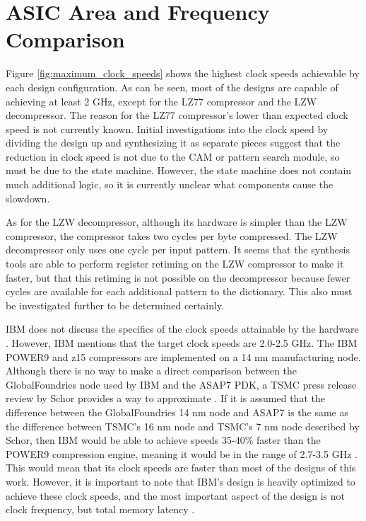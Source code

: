 \documentclass[doublespace,nopageskip]{VTthesis}
\begin{document}
\section{ASIC Area and Frequency Comparison}\label{se:asic_area_and_frequency_comparison}
Figure \ref{fig:maximum_clock_speeds} shows the highest clock speeds achievable by each design configuration. As can be seen, most of the designs are capable of achieving at least 2 GHz, except for the LZ77 compressor and the LZW decompressor. The reason for the LZ77 compressor's lower than expected clock speed is not currently known. Initial investigations into the clock speed by dividing the design up and synthesizing it as separate pieces suggest that the reduction in clock speed is not due to the CAM or pattern search module, so must be due to the state machine. However, the state machine does not contain much additional logic, so it is currently unclear what components cause the slowdown.

As for the LZW decompressor, although its hardware is simpler than the LZW compressor, the compressor takes two cycles per byte compressed. The LZW decompressor only uses one cycle per input pattern. It seems that the synthesis tools are able to perform register retiming on the LZW compressor to make it faster, but that this retiming is not possible on the decompressor because fewer cycles are available for each additional pattern to the dictionary. This also must be investigated further to be determined certainly.

IBM does not discuss the specifics of the clock speeds attainable by the hardware \cite{ibm}. However, IBM mentions that the target clock speeds are 2.0-2.5 GHz. The IBM POWER9 and z15 compressors are implemented on a 14 nm manufacturing node. Although there is no way to make a direct comparison between the GlobalFoundries node used by IBM and the ASAP7 PDK, a TSMC press release review by Schor provides a way to approximate \cite{wikichip-manufacturing-conversion}. If it is assumed that the difference between the GlobalFoundries 14 nm node and ASAP7 is the same as the difference between TSMC's 16 nm node and TSMC's 7 nm node described by Schor, then IBM would be able to achieve speeds 35-40\% faster than the POWER9 compression engine, meaning it would be in the range of 2.7-3.5 GHz \cite{wikichip-manufacturing-conversion}. This would mean that its clock speeds are faster than most of the designs of this work. However, it is important to note that IBM's design is heavily optimized to achieve these clock speeds, and the most important aspect of the design is not clock frequency, but total memory latency \cite{ibm}.
\end{document}

